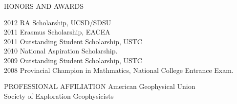 \documentclass{resume} %
\begin{document}
\begin{rSection}{HONORS AND  AWARDS}

2012  \quad \quad RA Scholarship, UCSD/SDSU\\
2011  \quad \quad Erasmus Scholarship, EACEA\\
2011  \quad \quad Outstanding Student Scholarship, USTC\\
2010  \quad \quad National Aspiration Scholarship.\\
2009  \quad \quad Outstanding Student Scholarship, USTC\\
2008  \quad \quad Provincial Champion in Mathmatics, National College Entrance Exam.

\end{rSection}



\begin{rSection}{PROFESSIONAL AFFILIATION}
American Geophysical Union \\ Society of Exploration Geophysicists


\end{rSection}

\end{document}
